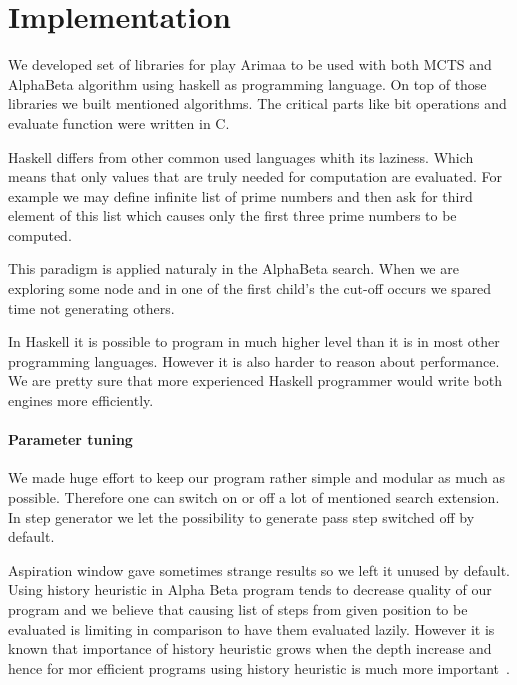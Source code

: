 \chapter{Implementation}
We developed set of libraries for play Arimaa to be used with both MCTS and
AlphaBeta algorithm using haskell as programming language. On top of those
libraries we built mentioned algorithms. The critical parts like bit operations
and evaluate function were written in C.

Haskell differs from other common used languages whith its laziness. Which means
that only values that are truly needed for computation are evaluated. For
example we may define infinite list of prime numbers and then ask for third
element of this list which causes only the first three prime numbers to be
computed.

This paradigm is applied naturaly in the AlphaBeta search. When we are
exploring some node and in one of the first child's the cut-off occurs we
spared time not generating others.


In Haskell it is possible to program in much higher level than it is in most
other programming languages. However it is also harder to reason about
performance. We are pretty sure that more experienced Haskell programmer would
write both engines more efficiently.

\subsubsection{Parameter tuning}

We made huge effort to keep our program rather simple and modular as much as
possible. Therefore one can switch on or off a lot of mentioned search
extension. In step generator we let the possibility to generate pass step
switched off by default.

Aspiration window gave sometimes strange results so we left it unused by default.
Using history heuristic in Alpha Beta program tends to decrease quality of our
program and we believe that causing list of steps from given position to be
evaluated is limiting in comparison to have them evaluated lazily. However it
is known that importance of history heuristic grows when the depth increase and
hence for mor efficient programs using history heuristic is much more
important~\cite{ZHONG}.


